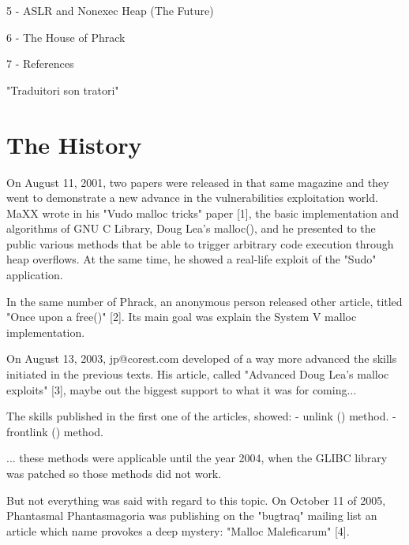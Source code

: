 \documentclass[12pt]{article}
\begin{document}
 5 - ASLR and Nonexec Heap (The Future)

 6 - The House of Phrack

 7 - References




\begin{verbnobox}[\small]
          "Traduitori son tratori"
\end{verbnobox}

\section{The History}

On August 11, 2001, two papers were released in that same magazine and
they went to demonstrate a new advance in the vulnerabilities exploitation
world.  MaXX wrote in his "Vudo malloc tricks" paper [1], the basic
implementation and algorithms of GNU C Library, Doug Lea's malloc(), and
he presented to the public various methods that be able to trigger
arbitrary code execution through heap overflows. At the same time, he
showed a real-life exploit of the "Sudo" application.
\newline

In the same number of Phrack, an anonymous person released other article,
titled "Once upon a free()" [2]. Its main goal was explain the System V
malloc implementation.
\newline

On August 13, 2003, jp@corest.com developed of a way more advanced
the skills initiated in the previous texts. His article, called "Advanced
Doug Lea's malloc exploits" [3], maybe out the biggest support to what it
was for coming...
\newline

The skills published in the first one of the articles, showed:
\newline
- unlink () method.
\newline
- frontlink () method.
\newline

... these methods were applicable until the year 2004, when the GLIBC
library was patched so those methods did not work. 
\newline

But not everything was said with regard to this topic. On October 11 of 
2005, Phantasmal Phantasmagoria was publishing on the "bugtraq" mailing
list an article which name provokes a deep mystery: "Malloc Maleficarum"
[4].
\newline
\end{document}
